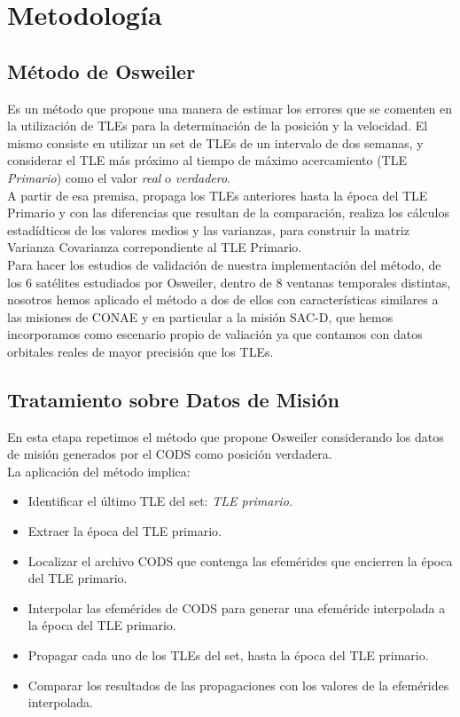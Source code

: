 \chapter{Metodología}
\label{chap:metodologia}


\section{M\'etodo de Osweiler}
Es un m\'etodo que propone una manera de estimar los errores que se comenten en la utilizaci\'on de TLEs para la determinaci\'on de la posici\'on y la velocidad.
 El mismo consiste en utilizar un set de TLEs de un intervalo de dos semanas, y considerar el TLE m\'as pr\'oximo al tiempo de m\'aximo acercamiento (TLE  {\it{Primario}}) como el valor {\it{real}} o {\it{verdadero}}.\\
 A partir de esa premisa, propaga los TLEs anteriores hasta la \'epoca del TLE Primario y con las diferencias que resultan de la comparaci\'on, realiza los c\'alculos estad\'idticos de los valores medios y las varianzas, para construir la matriz Varianza Covarianza correpondiente al TLE Primario.\\
 Para hacer los estudios de validaci\'on de nuestra implementaci\'on del m\'etodo, de los 6 sat\'elites estudiados por Osweiler, dentro de 8 ventanas temporales distintas, nosotros hemos aplicado el m\'etodo a dos de ellos con caracter\'isticas similares a las misiones de CONAE y en particular a la misi\'on SAC-D, que hemos incorporamos como escenario propio de valiaci\'on ya que contamos con datos orbitales reales de mayor precisi\'on que los TLEs.

\section{Tratamiento sobre Datos de Misi\'on}
En esta etapa repetimos el m\'etodo que propone Osweiler considerando los datos de misi\'on generados por el CODS
como posici\'on verdadera.\\
La aplicaci\'on del m\'etodo implica:
\begin{itemize}
 \item Identificar el \'ultimo TLE del set: {\it{TLE primario.}}
 \item Extraer la \'epoca del TLE primario.
 \item Localizar el archivo CODS que contenga las efem\'erides que encierren la \'epoca del TLE primario.
 \item Interpolar las efem\'erides de CODS para generar una efem\'eride interpolada a la \'epoca del TLE primario.
 \item Propagar cada uno de los TLEs del set, hasta la \'epoca del TLE primario.
 \item Comparar los resultados de las propagaciones con los valores de la efem\'erides interpolada.
\end{itemize}

